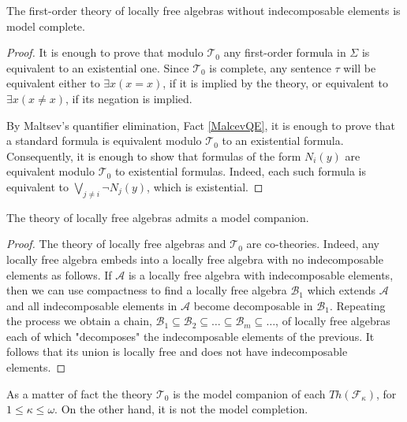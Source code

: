 \documentclass[a4paper,11pt]{article}
\begin{document}
\begin{proposition}
The first-order theory of locally free algebras without indecomposable elements is model complete. 
\end{proposition}
\begin{proof}
It is enough to prove that modulo $\mathcal{T}_0$ any first-order formula in $\Sigma$ is equivalent to an existential one. Since $\mathcal{T}_0$ is complete, any sentence $\tau$ will be equivalent either to $\exists x(x=x)$, if it is implied by the theory, or equivalent to $\exists x(x\neq x)$, if its negation is implied. 

By Maltsev's quantifier elimination, Fact \ref{MalcevQE}, it is enough to prove that a standard formula is equivalent modulo $\mathcal{T}_0$ to an existential formula. Consequently, it is enough to show that formulas of the form $N_i(y)$ are equivalent modulo $\mathcal{T}_0$ to existential formulas. Indeed, each such formula is equivalent to $\bigvee_{j\neq i}\lnot N_j(y)$, which is existential.   
\end{proof}

\begin{corollary}
The theory of locally free algebras admits a model companion. 
\end{corollary}
\begin{proof}
The theory of locally free algebras and $\mathcal{T}_0$ are co-theories. Indeed, any locally free algebra embeds into a locally free algebra with no indecomposable elements as follows. If $\mathcal{A}$ is a locally free algebra with indecomposable elements, then we can use compactness to find a locally free algebra $\mathcal{B}_1$ which extends $\mathcal{A}$ and all indecomposable elements in $\mathcal{A}$ become decomposable in $\mathcal{B}_1$. Repeating the process we obtain a chain, $\mathcal{B}_1\subseteq \mathcal{B}_2\subseteq \ldots\subseteq \mathcal{B}_m\subseteq\ldots$, of locally free algebras each of which "decomposes" the indecomposable elements of the previous. It follows that its union is locally free and does not have indecomposable elements.   
\end{proof}

As a matter of fact the theory $\mathcal{T}_0$ is the model companion of each $Th(\mathcal{F}_\kappa)$, for $1\leq \kappa\leq \omega$. On the other hand, it is not the model completion. 
\end{document}
